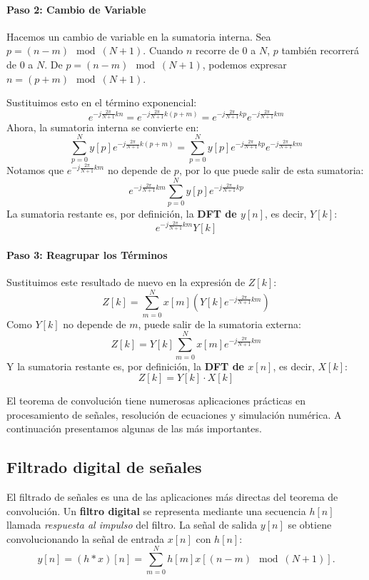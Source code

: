 \documentclass[a4paper,11pt]{report}
\begin{document}
\paragraph{Paso 2: Cambio de Variable}
Hacemos un cambio de variable en la sumatoria interna. Sea $p = (n-m) \mod (N+1)$.
Cuando $n$ recorre de $0$ a $N$, $p$ también recorrerá de $0$ a $N$.
De $p = (n-m) \mod (N+1)$, podemos expresar $n = (p+m) \mod (N+1)$.

Sustituimos esto en el término exponencial:
$$e^{-j \frac{2\pi}{N+1} kn} = e^{-j \frac{2\pi}{N+1} k(p+m)} = e^{-j \frac{2\pi}{N+1} kp} e^{-j \frac{2\pi}{N+1} km}$$
Ahora, la sumatoria interna se convierte en:
$$\sum_{p=0}^{N} y[p] e^{-j \frac{2\pi}{N+1} k(p+m)} = \sum_{p=0}^{N} y[p] e^{-j \frac{2\pi}{N+1} kp} e^{-j \frac{2\pi}{N+1} km}$$
Notamos que $e^{-j \frac{2\pi}{N+1} km}$ no depende de $p$, por lo que puede salir de esta sumatoria:
$$e^{-j \frac{2\pi}{N+1} km} \sum_{p=0}^{N} y[p] e^{-j \frac{2\pi}{N+1} kp}$$
La sumatoria restante es, por definición, la \textbf{DFT de $y[n]$}, es decir, $Y[k]$:
$$e^{-j \frac{2\pi}{N+1} km} Y[k]$$

\paragraph{Paso 3: Reagrupar los Términos}
Sustituimos este resultado de nuevo en la expresión de $Z[k]$:
$$Z[k] = \sum_{m=0}^{N} x[m] \left( Y[k] e^{-j \frac{2\pi}{N+1} km} \right)$$
Como $Y[k]$ no depende de $m$, puede salir de la sumatoria externa:
$$Z[k] = Y[k] \sum_{m=0}^{N} x[m] e^{-j \frac{2\pi}{N+1} km}$$
Y la sumatoria restante es, por definición, la \textbf{DFT de $x[n]$}, es decir, $X[k]$:
$$Z[k] = Y[k] \cdot X[k]$$

El teorema de convolución tiene numerosas aplicaciones prácticas en procesamiento de señales, resolución de ecuaciones y simulación numérica. A continuación presentamos algunas de las más importantes.

\subsection{Filtrado digital de señales}

El filtrado de señales es una de las aplicaciones más directas del teorema de convolución. Un \textbf{filtro digital} se representa mediante una secuencia $h[n]$ llamada \emph{respuesta al impulso} del filtro. La señal de salida $y[n]$ se obtiene convolucionando la señal de entrada $x[n]$ con $h[n]$:
\[
y[n] = (h * x)[n] = \sum_{m=0}^{N} h[m] x[(n-m) \mod (N+1)].
\]
\end{document}
